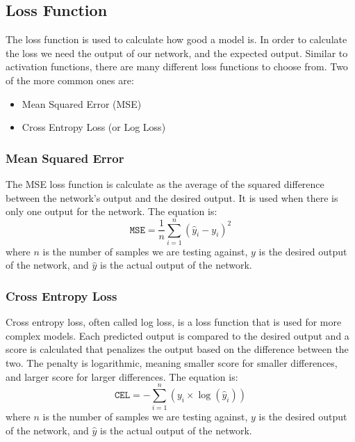 \documentclass[titlepage]{article}
\begin{document}
\subsection{Loss Function}
The loss function is used to calculate how good a model is. In order to calculate the loss we need the output of our network, and the expected output\cite{Loss Functions}. Similar to activation functions, there are many different loss functions to choose from. Two of the more common ones are:
\begin{itemize}
    \item Mean Squared Error (MSE)
    \item Cross Entropy Loss (or Log Loss)
\end{itemize}

\subsubsection{Mean Squared Error}
The MSE loss function is calculate as the average of the squared difference between the network's output and the desired output. It is used when there is only one output for the network. The equation is:
\begin{equation}
    \texttt{MSE} = \frac{1}{n} \sum_{i=1}^{n} (\hat{y}_i - y_i)^2
    \label{eq:MSE}
\end{equation}
where $n$ is the number of samples we are testing against, $y$ is the desired output of the network, and $\hat{y}$ is the actual output of the network.

\subsubsection{Cross Entropy Loss}
Cross entropy loss, often called log loss, is a loss function that is used for more complex models. Each predicted output is compared to the desired output and a score is calculated that penalizes the output based on the difference between the two. The penalty is logarithmic, meaning smaller score for smaller differences, and larger score for larger differences. The equation is:
\begin{equation}
    \texttt{CEL} = -\sum_{i=1}^{n}(y_i\times\log(\hat{y}_i))
    \label{eq:CEL}
\end{equation}
where $n$ is the number of samples we are testing against, $y$ is the desired output of the network, and $\hat{y}$ is the actual output of the network.
\end{document}
